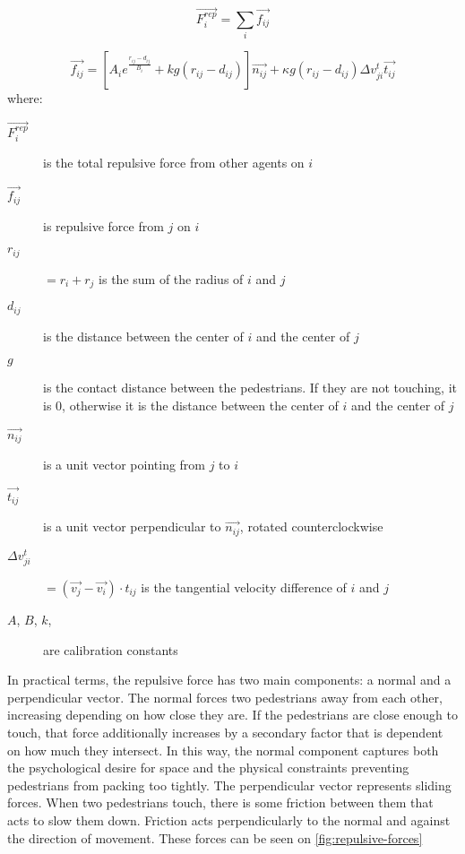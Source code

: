 \documentclass[twoside, 11pt]{article}
\begin{document}
\begin{equation}
  \vec{F_i^{rep}} = \sum_i\vec{f_{ij}}
  \label{eq:pedestrian_repulsion_total}
\end{equation}

\begin{equation}
  \vec{f_{ij}} = [A_ie^{\frac{r_{ij} - d_{ij}}{B_i}} + kg(r_{ij}-d_{ij})]\vec{n_{ij}} + \kappa g (r_{ij} - d_{ij})\Delta v_{ji}^t \vec{t_{ij}}
  \label{eq:pedestrian_repulsion}
\end{equation}
where:
\begin{description}
  \item[$\vec{F_i^{rep}}$] is the total repulsive force from other agents on $i$
  \item[$\vec{f_{ij}}$] is repulsive force from $j$ on $i$
  
  \item[$r_{ij}$] $= r_i + r_j$ is the sum of the radius of $i$ and $j$
  \item[$d_{ij}$] is the distance between the center of $i$ and the center of $j$
  \item[$g$] is the contact distance between the pedestrians. If they are not touching, it is $0$, otherwise it is the distance between the center of $i$ and the center of $j$
  \item[$\vec{n_{ij}}$] is a unit vector pointing from $j$ to $i$
  \item[$\vec{t_{ij}}$] is a unit vector perpendicular to $\vec{n_{ij}}$, rotated counterclockwise
  \item[$\Delta v_{ji}^t$] $= (\vec{v_j} - \vec{v_i}) \cdot t_{ij}$ is the tangential velocity difference of $i$ and $j$
  \item[$A$, $B$, $k$, \kappa] are calibration constants
\end{description}

In practical terms, the repulsive force has two main components: a normal and a perpendicular vector. The normal forces two pedestrians away from each other, increasing depending on how close they are. If the pedestrians are close enough to touch, that force additionally increases by a secondary factor that is dependent on how much they intersect. In this way, the normal component captures both the psychological desire for space and the physical constraints preventing pedestrians from packing too tightly. The perpendicular vector represents sliding forces. When two pedestrians touch, there is some friction between them that acts to slow them down. Friction acts perpendicularly to the normal and against the direction of movement. These forces can be seen on \autoref{fig:repulsive-forces}
\end{document}
